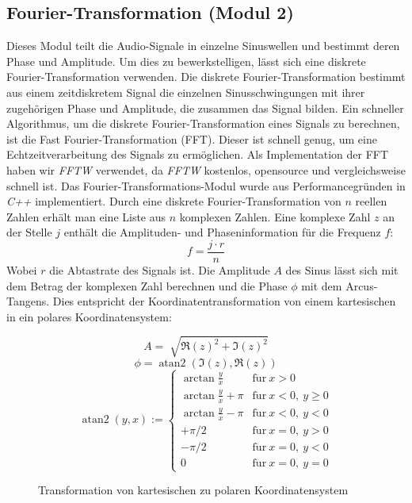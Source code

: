\subsection{Fourier-Transformation (Modul 2)}
Dieses Modul teilt die Audio-Signale in einzelne Sinuswellen und bestimmt deren Phase und Amplitude. Um dies zu bewerkstelligen, lässt sich eine diskrete Fourier-Transformation verwenden. Die diskrete Fourier-Transformation bestimmt aus einem zeitdiskretem Signal die einzelnen Sinusschwingungen mit ihrer zugehörigen Phase und Amplitude, die zusammen das Signal bilden. Ein schneller Algorithmus, um die diskrete Fourier-Transformation eines Signals zu berechnen, ist die Fast Fourier-Transformation (FFT). Dieser ist schnell genug, um eine Echtzeitverarbeitung des Signals zu ermöglichen. Als Implementation der FFT haben wir \textit{FFTW}\cite{FFTW} verwendet, da \textit{FFTW} kostenlos, opensource und vergleichsweise schnell ist.
Das Fourier-Transformations-Modul wurde aus Performancegründen in \textit{C++} implementiert.
Durch eine diskrete Fourier-Transformation von $n$ reellen Zahlen erhält man eine Liste aus $n$ komplexen Zahlen. Eine komplexe Zahl $z$ an der Stelle $j$ enthält die Amplituden- und Phaseninformation für die Frequenz $f$:
$$
f = \frac{j\cdot r}{n}
$$
Wobei $r$ die Abtastrate des Signals ist. Die Amplitude $A$ des Sinus lässt sich mit dem Betrag der komplexen Zahl berechnen und die Phase $\phi$ mit dem Arcus-Tangens. Dies entspricht der Koordinatentransformation von einem kartesischen in ein polares Koordinatensystem:\\
\begin{minipage}{0.49\textwidth}
  $$
  A = \sqrt[]{{\Re(z)}^2 + {\Im(z)}^2}
  $$
  $$
  \phi = \operatorname{atan2}(\Im(z), \Re(z))
  $$
  $$
  \operatorname{atan2}(y,x) := \begin{cases} \arctan\frac{y}{x} & \mathrm{f\ddot ur}\ x > 0\\ \arctan\frac{y}{x} + \pi & \mathrm{f\ddot ur}\ x < 0,\ y \geq 0\\ \arctan\frac{y}{x} - \pi & \mathrm{f\ddot ur}\ x < 0,\ y < 0\\ +\pi/2 & \mathrm{f\ddot ur}\ x = 0,\ y > 0\\ -\pi/2 & \mathrm{f\ddot ur}\ x = 0,\ y < 0\\ 0 & \mathrm{f\ddot ur}\ x = 0,\ y = 0 \end{cases}
  $$
\end{minipage}
\begin{minipage}{0.49\textwidth}
  \begin{figure}[H]
    \centering
    \scalebox{.7}{}
    \caption{Transformation von kartesischen zu polaren Koordinatensystem}
    \label{fig:polarconvert}
  \end{figure}
\end{minipage}
